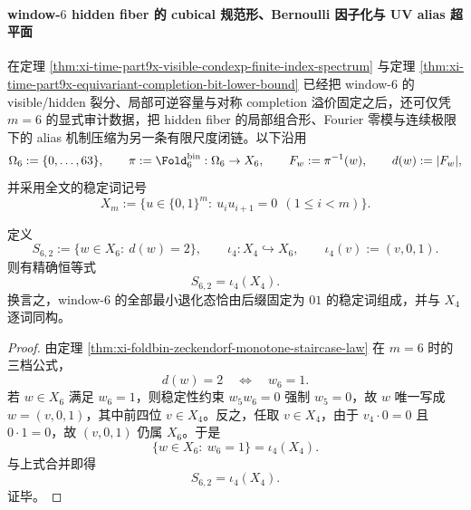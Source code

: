 \paragraph{window-\(6\) hidden fiber 的 cubical 规范形、Bernoulli 因子化与 UV alias 超平面}
在定理 \ref{thm:xi-time-part9x-visible-condexp-finite-index-spectrum} 与定理 \ref{thm:xi-time-part9x-equivariant-completion-bit-lower-bound} 已经把 window-\(6\) 的 visible/hidden 裂分、局部可逆容量与对称 completion 溢价固定之后，还可仅凭 \(m=6\) 的显式审计数据，把 hidden fiber 的局部组合形、Fourier 零模与连续极限下的 alias 机制压缩为另一条有限尺度闭链。以下沿用
\[
\Omega_6:=\{0,\dots,63\},
\qquad
\pi:=\Fold_6^{\mathrm{bin}}:\Omega_6\to X_6,
\qquad
F_w:=\pi^{-1}(w),
\qquad
d(w):=|F_w|,
\]
并采用全文的稳定词记号
\[
X_m:=\{u\in\{0,1\}^m:\ u_i u_{i+1}=0\ \ (1\le i<m)\}.
\]

\begin{theorem}\label{thm:xi-time-part9xab-window6-minsector-rigid-x4-subcover}
定义
\[
S_{6,2}:=\{w\in X_6:\ d(w)=2\},
\qquad
\iota_4:X_4\hookrightarrow X_6,
\qquad
\iota_4(v):=(v,0,1).
\]
则有精确恒等式
\[
S_{6,2}=\iota_4(X_4).
\]
换言之，window-\(6\) 的全部最小退化态恰由后缀固定为 \(01\) 的稳定词组成，并与 \(X_4\) 逐词同构。
\end{theorem}
\begin{proof}
由定理 \ref{thm:xi-foldbin-zeckendorf-monotone-staircase-law} 在 \(m=6\) 时的三档公式，
\[
d(w)=2
\quad\Longleftrightarrow\quad
w_6=1.
\]
若 \(w\in X_6\) 满足 \(w_6=1\)，则稳定性约束 \(w_5w_6=0\) 强制 \(w_5=0\)，故 \(w\) 唯一写成 \(w=(v,0,1)\)，其中前四位 \(v\in X_4\)。反之，任取 \(v\in X_4\)，由于 \(v_4\cdot 0=0\) 且 \(0\cdot 1=0\)，故 \((v,0,1)\) 仍属 \(X_6\)。于是
\[
\{w\in X_6:\ w_6=1\}=\iota_4(X_4).
\]
与上式合并即得
\[
S_{6,2}=\iota_4(X_4).
\]
证毕。
\end{proof}

